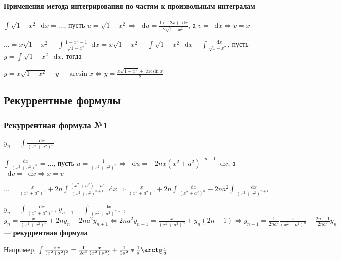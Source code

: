 \documentclass{article}
\newcommand*\diff{\mathop{}\!\mathrm{d}}
\begin{document}
\paragraph{Применения метода интегрирования по частям к произвольным интегралам}

$\int \sqrt{1 - x^2} \diff x = \dots$, пусть $u = \sqrt{1 - x^2} \Longrightarrow \diff u = \frac{1(-2x) \diff x}{2\sqrt{1 - x^2}}$, а $v = \diff x \Longrightarrow v = x$

$\dots = x \sqrt{1 - x^2} - \int \frac{1 - x^2 - 1}{\sqrt{1 - x^2}} \diff x = x \sqrt{1 - x^2} - \int \sqrt{1 - x^2} \diff x + \int \frac{\diff x}{\sqrt{1 - x^2}}$, пусть $y = \int \sqrt{1 - x^2} \diff x$, тогда

$y = x \sqrt{1 - x^2} - y + \arcsin x \Longleftrightarrow y = \frac{x \sqrt{1 - x^2} + \arcsin x}{2}$

\pagebreak
\subsection{Рекуррентные формулы}

\subsubsection{Рекуррентная формула №1}

$y_{n} = \int \frac{\diff x}{(x^2 + a^2)^{n}}$

\hfill

$\int \frac{\diff x}{(x^2 + a^2)^{n}} = \dots$, пусть $u = \frac{1}{(x^2 + a^2)^{n}} \Longrightarrow \diff u = - 2 n x (x^2 + a^2)^{-n - 1} \diff x$, а $\diff v = \diff x \Longrightarrow x = v$

$\dots = \frac{x}{(x^2 + a^2)^{n}} + 2 n \int \frac{(x^2 + a^{2}) - a^{2}}{(x^2 + a^2)^{n + 1}} \diff x \Longrightarrow \frac{x}{(x^2 + a^2)^{n}} + 2 n \int \frac{\diff x}{(x^2 + a^2)^{n}} - 2 n a^2 \int \frac{\diff x}{(x^2 + a^2)^{n + 1}}$

\hfill 

$y_n = \int \frac{\diff x}{(x^2 + a^2)^{n}}$, $y_{n + 1} = \int \frac{\diff x}{(x^2 + a^2)^{n + 1}}$, $y_n = \frac{x}{(x^2 + a^2)^{n}} + 2 n y_n - 2 n a ^2 y_{n + 1} \Longleftrightarrow 2 n a^2 y_{n + 1} = \frac{x}{(x^2 + a^2)^{n}} + y_n (2 n - 1) \Longleftrightarrow y_{n + 1} = \frac{1}{2 n a^2} \frac{x}{(x^2 + a^2)^{n}} + \frac{2 n - 1}{2 n a^2} y_n$ — \textbf{рекуррентная формула}

\hfill

Например, $\int \frac{\diff x}{(x^2 + a^2)^{2}} = \frac{1}{2 a^2} \frac{x}{(x^2 + a^2)} + \frac{1}{2a^2} * \frac{1}{a} \arctg \frac{x}{a}$
\end{document}
